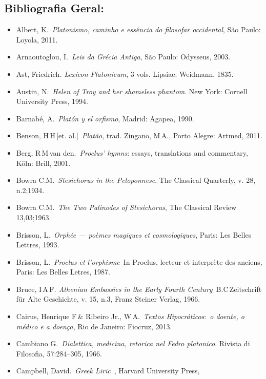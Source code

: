  

 

\subsection{Bibliografia Geral:}

 

\begin{itemize}
\itemsep1pt\parskip0pt
\item
  Albert, K.~\emph{Platonismo, caminho e essência do filosofar
  occidental}, São Paulo: Loyola, 2011.
\item
  Arnaoutoglou, I.~\emph{Leis da Grécia Antiga}, São Paulo: Odysseus,
  2003.
\item
  Ast, Friedrich\emph{. Lexicon Platonicum}, 3 vols. Lipsiae: Weidmann,
  1835.
\item
  Austin, N.~\emph{Helen of Troy and her shameless phantom}. New York:
  Cornell University Press, 1994.
\item
  Barnabé, A.~\emph{Platón y el orfismo}, Madrid: Agapea, 1990.
\item
  Benson, H\,H\,[et. al.]~\emph{Platão}, trad. Zingano, M\,A., Porto
  Alegre: Artmed, 2011.
\item
  Berg, R\,M\,van den.~\emph{Proclus' hymns}: essays, translations and
  commentary, Köln: Brill, 2001.
\item
  Bowra C.M.~\emph{Stesichorus in the Peloponnese}, The Classical
  Quarterly, v. 28, n.2;1934.
\item
  Bowra C.M.~\emph{The Two Palinodes of Stesichorus}, The Classical
  Review 13,03;1963.
\item
  Brisson, L.~\emph{Orphée --- poèmes magiques et cosmologiques}, Paris:
  Les Belles Lettres, 1993.
\item
  Brisson, L.~\emph{Proclus et l'orphisme}~In Proclus, lecteur et
  interprète des anciens, Paris: Les Belles Letres, 1987.
\item
  Bruce, I\,A\,F\emph{. Athenian Embassies in the Early Fourth
  Century}~B.C\,Zeitschrift für Alte Geschichte, v. 15, n.3, Franz
  Steiner Verlag, 1966.
\item
  Cairus, Henrique F\,\& Ribeiro Jr., W\,A.~\emph{Textos
  Hipocráticos}:~\emph{o doente, o médico e a doença}, Rio de Janeiro:
  Fiocruz, 2013.
\item
  Cambiano G.~\emph{Dialettica, medicina, retorica nel Fedro platonico}.
  Rivista di Filosofia, 57:284--305, 1966.
\item
  Campbell, David.~\emph{Greek Liric}~, Harvard University Press,

\end{itemize}
